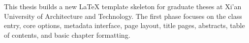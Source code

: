 \begin{abstracten}
This thesis builds a new LaTeX template skeleton for graduate theses at Xi'an University of Architecture and Technology. The first phase focuses on the class entry, core options, metadata interface, page layout, title pages, abstracts, table of contents, and basic chapter formatting.
\end{abstracten}
